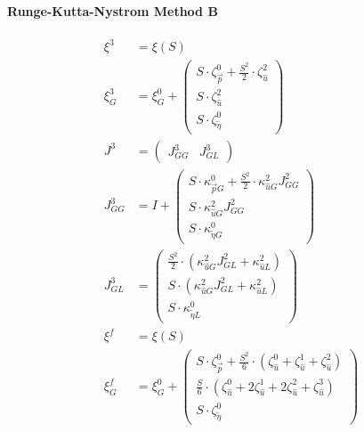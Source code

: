 \documentclass[review]{elsarticle}
\begin{document}
\paragraph{Runge-Kutta-Nystrom Method B}
\begin{equation} \begin{alignedat}{-1}
    \xi^{3}&=\xi\left(S\right) \\
    \xi_{G}^{3}&=\xi_{G}^{0}+\left(\begin{array}{l}
        S\cdot\zeta_{\vec{p}}^{0}+\frac{S^{2}}{2}\cdot\zeta_{\hat{u}}^{2}\\
        S\cdot\zeta_{\hat{u}}^{2}\\
        S\cdot\zeta_{\tilde{\eta}}^{0}
    \end{array}\right) \\
    J^{3}&=\left(\begin{array}{cc}
        J_{GG}^{3} & J_{GL}^{3}
    \end{array}\right) \\
    J_{GG}^{3}&=I+\left(\begin{array}{l}
        S\cdot\kappa_{\vec{p}G}^{0}+\frac{S^{2}}{2}\cdot\kappa_{\hat{u}G}^{2}J_{GG}^{2}\\
        S\cdot\kappa_{\hat{u}G}^{2}J_{GG}^{2}\\
        S\cdot\kappa_{\tilde{\eta}G}^{0}
    \end{array}\right) \\
    J_{GL}^{3}&=\left(\begin{array}{l}
        \frac{S^{2}}{2}\cdot\left(\kappa_{\hat{u}G}^{2}J_{GL}^{2}+\kappa_{\hat{u}L}^{2}\right)\\
        S\cdot\left(\kappa_{\hat{u}G}^{2}J_{GL}^{2}+\kappa_{\hat{u}L}^{2}\right)\\
        S\cdot\kappa_{\tilde{\eta}L}^{0}
    \end{array}\right) \\
    \xi^{f}&=\xi\left(S\right) \\
    \xi_{G}^{f}&=\xi_{G}^{0}+\left(\begin{array}{l}
        S\cdot\zeta_{\vec{p}}^{0}+\frac{S^{2}}{6}\cdot\left(\zeta_{\hat{u}}^{0}+\zeta_{\hat{u}}^{1}+\zeta_{\hat{u}}^{2}\right)\\
        \frac{S}{6}\cdot\left(\zeta_{\hat{u}}^{0}+2\zeta_{\hat{u}}^{1}+2\zeta_{\hat{u}}^{2}+\zeta_{\hat{u}}^{3}\right)\\
        S\cdot\zeta_{\tilde{\eta}}^{0}
    \end{array}\right) \\

\end{alignedat}
\end{equation}
\end{document}
